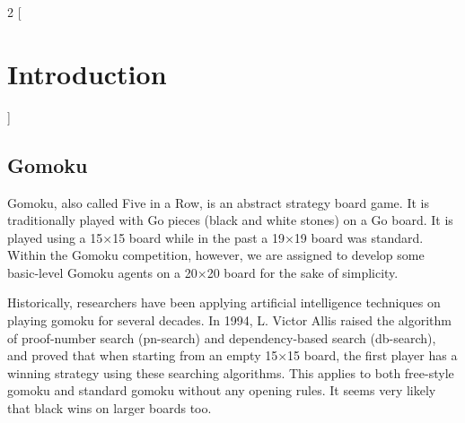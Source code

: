 \documentclass[a4paper, 11pt]{article} %
\begin{document}
\begin{multicols}{2}
    [
        \section{Introduction}
    ]

    \subsection{Gomoku}
    Gomoku, also called Five in a Row, is an abstract strategy board game. It is traditionally played with Go pieces (black and white stones) on a Go board. It is played using a 15×15 board while in the past a 19×19 board was standard. Within the Gomoku competition, however, we are assigned to develop some basic-level Gomoku agents on a 20×20 board for the sake of simplicity.
    
    Historically, researchers have been applying artificial intelligence techniques on playing gomoku for several decades. In 1994, L. Victor Allis raised the algorithm of proof-number search (pn-search) and dependency-based search (db-search), and proved that when starting from an empty 15×15 board, the first player has a winning strategy using these searching algorithms. This applies to both free-style gomoku and standard gomoku without any opening rules. It seems very likely that black wins on larger boards too.
    

\end{multicols}
\end{document}
